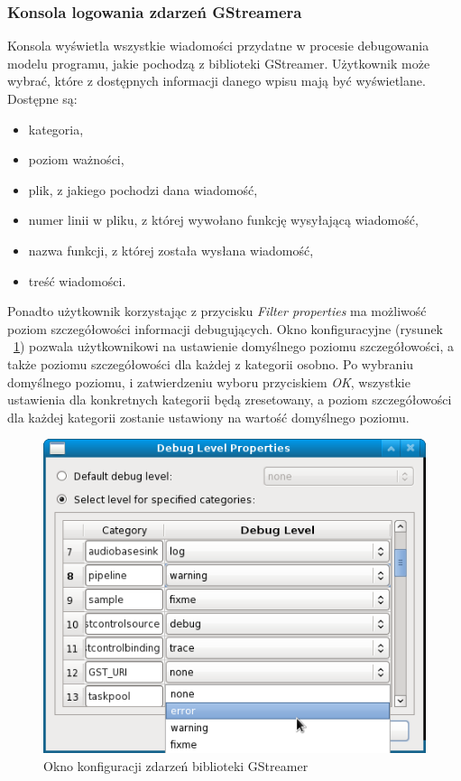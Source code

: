 \documentclass[12pt]{article}
\begin{document}
\subsubsection{Konsola logowania zdarzeń GStreamera}
Konsola wyświetla wszystkie wiadomości przydatne w procesie debugowania modelu programu, jakie pochodzą z biblioteki GStreamer. Użytkownik może wybrać, które z dostępnych informacji danego wpisu mają być wyświetlane. Dostępne są:
\begin{itemize}
 \setlength{\itemsep}{0em}
\item kategoria,
\item poziom ważności,
\item plik, z jakiego pochodzi dana wiadomość,
\item numer linii w pliku, z której wywołano funkcję wysyłającą wiadomość,
\item nazwa funkcji, z której została wysłana wiadomość,
\item treść wiadomości.
\end{itemize}
Ponadto użytkownik korzystając z przycisku \textit{Filter properties} ma możliwość poziom szczegółowości informacji debugujących. Okno konfiguracyjne (rysunek ~\ref{fig:debugLevelProperties}) pozwala użytkownikowi na ustawienie domyślnego poziomu szczegółowości, a także poziomu szczegółowości dla każdej z kategorii osobno. Po wybraniu domyślnego poziomu, i zatwierdzeniu wyboru przyciskiem \textit{OK}, wszystkie ustawienia dla konkretnych kategorii będą zresetowany, a poziom szczegółowości dla każdej kategorii zostanie ustawiony na wartość domyślnego poziomu.
\begin{figure}[H]
  \includegraphics[width=130mm]{img/debug-level-properties.png}
  \caption{Okno konfiguracji zdarzeń biblioteki GStreamer}
  \label{fig:debugLevelProperties}
\end{figure}
\end{document}
